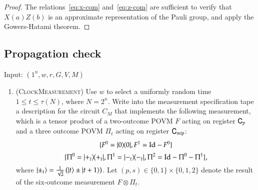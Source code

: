 \begin{proof}
The relations~\eqref{eq:x-com} and~\eqref{eq:z-com} are sufficient to verify that $X(a)Z(b)$ is an approximate representation of the Pauli group, and apply the Gowers-Hatami theorem.
\end{proof}



\subsection{Propagation check}
\label{sec:prop_check}

\vspace{10pt}
\begin{center}
\begin{mdframed}
    Input: $(1^n,w,r,G,V,M)$
	\begin{enumerate}
		\item (\textsc{ClockMeasurement}) Use $w$ to select a uniformly random time $1 \leq t \leq \tau(N)$, where $N = 2^n$. Write into the measurement specification tape a description for the circuit $C_M$ that implements the following measurement, which is a tensor product of a two-outcome POVM $F$ acting on register ${\textsf{C}}_p$ and a three outcome POVM $\Pi_t$ acting on register ${\textsf{C}}_{mip}$: %
\[
	\{F^0 = |0\rangle\! \langle 0|, F^1 = \mathop{\mathrm{Id}}\!\mathinner{} - F^0 \}
\]
\[
	\{ 	\Pi^0 = |+_t\rangle\! \langle +_t|, 
	\Pi^1 = |-_t\rangle\! \langle -_t|, 
	\Pi^2 = \mathop{\mathrm{Id}}\!\mathinner{} - \Pi^0 - \Pi^1 \},
\]	
where $|\pm_t\rangle = \frac{1}{\sqrt{2}} \left( |t\rangle \pm |t+1\rangle \right)$. Let $(p,s) \in \{0,1\} \times \{0,1,2\}$ denote the result of the six-outcome measurement $F \otimes \Pi_t$.


\end{enumerate}
\end{mdframed}
\end{center}
